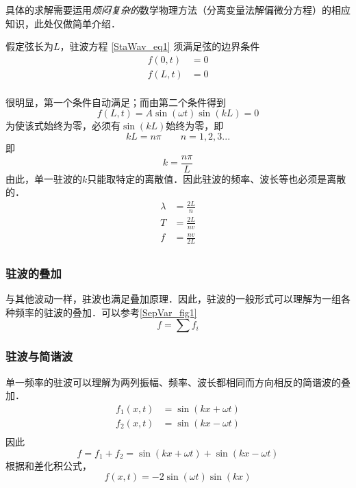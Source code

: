 具体的求解需要运用\textsl{烦闷复杂的}数学物理方法（分离变量法解偏微分方程）的相应知识，此处仅做简单介绍．

假定弦长为$L$，驻波方程 \autoref{StaWav_eq1} 须满足弦的边界条件 
$$
\begin{aligned}
f(0,t)&=0\\
f(L,t)&=0\\
\end{aligned}
$$

很明显，第一个条件自动满足；而由第二个条件得到
$$
f(L,t)=A\sin(\omega t)\sin(kL)=0
$$
为使该式始终为零，必须有$\sin(kL)$始终为零，即
$$kL = n\pi \qquad n=1,2,3...$$
即
\begin{equation}
k=\frac{n\pi}{L}
\end{equation}
由此，单一驻波的$k$只能取特定的离散值．因此驻波的频率、波长等也必须是离散的．
\begin{equation}
\begin{aligned}
\lambda &=\frac{2L}{n}\\
T &=\frac{2L}{nv}\\
f &=\frac{nv}{2L}\\
\end{aligned}
\end{equation}
\subsubsection{驻波的叠加}
与其他波动一样，驻波也满足叠加原理．因此，驻波的一般形式可以理解为一组各种频率的驻波的叠加．可以参考\autoref{SepVar_fig1}~
$$f=\sum f_i$$

\subsubsection{驻波与简谐波}
单一频率的驻波可以理解为两列振幅、频率、波长都相同而方向相反的简谐波的叠加．
$$
\begin{aligned}
f_1(x,t)&=\sin(kx+\omega t)\\
f_2(x,t)&=\sin(kx-\omega t)\\
\end{aligned}
$$
因此
$$f=f_1+f_2=\sin(kx+\omega t)+\sin(kx-\omega t)$$
根据和差化积公式，
\begin{equation}
f(x,t)=-2\sin(\omega t)\sin(kx)
\end{equation}

